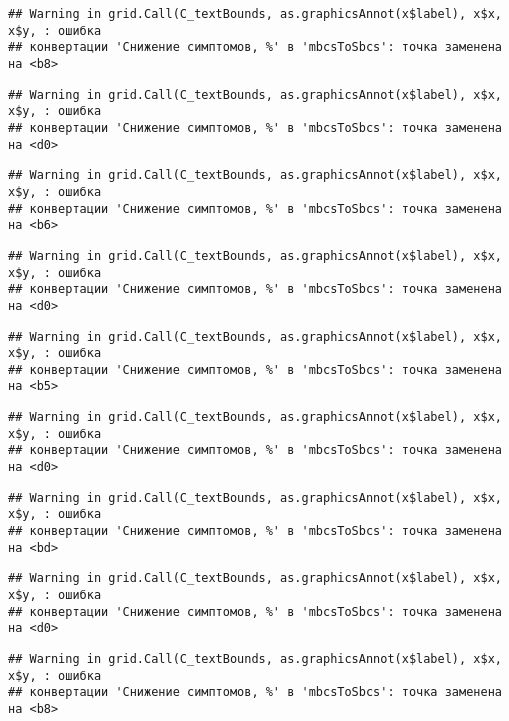 \documentclass[
]{article}
\begin{document}
\begin{verbatim}
## Warning in grid.Call(C_textBounds, as.graphicsAnnot(x$label), x$x, x$y, : ошибка
## конвертации 'Снижение симптомов, %' в 'mbcsToSbcs': точка заменена на <b8>
\end{verbatim}

\begin{verbatim}
## Warning in grid.Call(C_textBounds, as.graphicsAnnot(x$label), x$x, x$y, : ошибка
## конвертации 'Снижение симптомов, %' в 'mbcsToSbcs': точка заменена на <d0>
\end{verbatim}

\begin{verbatim}
## Warning in grid.Call(C_textBounds, as.graphicsAnnot(x$label), x$x, x$y, : ошибка
## конвертации 'Снижение симптомов, %' в 'mbcsToSbcs': точка заменена на <b6>
\end{verbatim}

\begin{verbatim}
## Warning in grid.Call(C_textBounds, as.graphicsAnnot(x$label), x$x, x$y, : ошибка
## конвертации 'Снижение симптомов, %' в 'mbcsToSbcs': точка заменена на <d0>
\end{verbatim}

\begin{verbatim}
## Warning in grid.Call(C_textBounds, as.graphicsAnnot(x$label), x$x, x$y, : ошибка
## конвертации 'Снижение симптомов, %' в 'mbcsToSbcs': точка заменена на <b5>
\end{verbatim}

\begin{verbatim}
## Warning in grid.Call(C_textBounds, as.graphicsAnnot(x$label), x$x, x$y, : ошибка
## конвертации 'Снижение симптомов, %' в 'mbcsToSbcs': точка заменена на <d0>
\end{verbatim}

\begin{verbatim}
## Warning in grid.Call(C_textBounds, as.graphicsAnnot(x$label), x$x, x$y, : ошибка
## конвертации 'Снижение симптомов, %' в 'mbcsToSbcs': точка заменена на <bd>
\end{verbatim}

\begin{verbatim}
## Warning in grid.Call(C_textBounds, as.graphicsAnnot(x$label), x$x, x$y, : ошибка
## конвертации 'Снижение симптомов, %' в 'mbcsToSbcs': точка заменена на <d0>
\end{verbatim}

\begin{verbatim}
## Warning in grid.Call(C_textBounds, as.graphicsAnnot(x$label), x$x, x$y, : ошибка
## конвертации 'Снижение симптомов, %' в 'mbcsToSbcs': точка заменена на <b8>
\end{verbatim}
\end{document}
